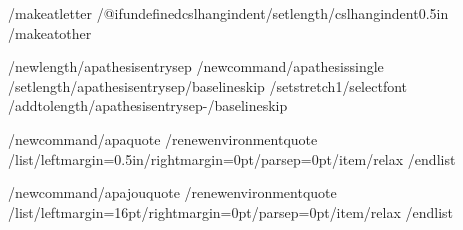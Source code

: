 /makeatletter
/@ifundefined{cslhangindent}{}{/setlength{/cslhangindent}{0.5in}}
/makeatother


%
/newlength{/apathesisentrysep}
/newcommand{/apathesissingle}{%
  /setlength{/apathesisentrysep}{/baselineskip}%
  /setstretch{1}/selectfont
  /addtolength{/apathesisentrysep}{-/baselineskip}}

%
/newcommand{/apaquote}{%
  /renewenvironment{quote}
    {/list{}{/leftmargin=0.5in/rightmargin=0pt/parsep=0pt}/item/relax}
    {/endlist}}

/newcommand{/apajouquote}{%
  /renewenvironment{quote}
    {/list{}{/leftmargin=16pt/rightmargin=0pt/parsep=0pt}/item/relax}
    {/endlist}}

